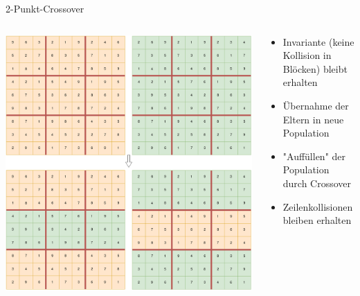 \begin{frame}{2-Punkt-Crossover}
    \begin{columns}[T] %
        \begin{column}{0.65\textwidth}
            \vspace*{0.4cm}
            \includegraphics[width=\textwidth]{Pictures/2-Punkt-Crossover.png}
        \end{column}
        \begin{column}{0.35\textwidth}
            \begin{itemize}
                \vspace*{0.4cm}
                \item Invariante (keine Kollision in Blöcken) bleibt erhalten
                \item Übernahme der Eltern in neue Population
                \item "{}Auffüllen{}"{} der Population durch Crossover 
                \item Zeilenkollisionen bleiben erhalten
            \end{itemize}
        \end{column}
    \end{columns}
\end{frame}
